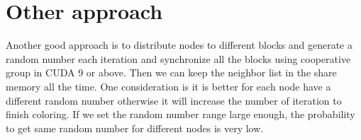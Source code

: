 \documentclass[12pt] {article}
\begin{document}
\section{Other approach}
Another good approach is to distribute nodes to different blocks and generate a random number each iteration and synchronize all the blocks using cooperative group in CUDA 9 or above. Then we can keep the neighbor list in the share memory all the time. One consideration is it is better for each node have a different random number otherwise it will increase the number of iteration to finish coloring. If we set the random number range large enough, the probability to get same random number for different nodes is very low.
\end{document}
